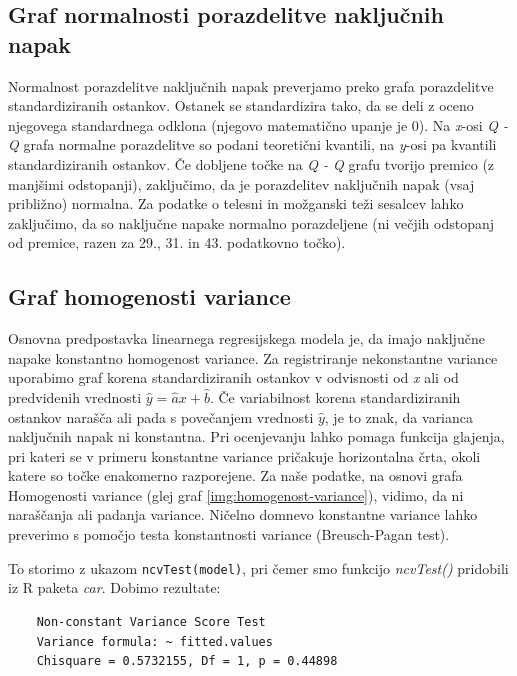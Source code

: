 \subsection{Graf normalnosti porazdelitve naključnih napak}

Normalnost porazdelitve naključnih napak preverjamo preko grafa porazdelitve standardiziranih
ostankov. Ostanek se standardizira tako, da se deli z oceno njegovega standardnega odklona
(njegovo matematično upanje je 0).
Na \emph{x}-osi \emph{Q - Q} grafa normalne porazdelitve so podani teoretični kvantili, na \emph{y}-osi pa kvantili
standardiziranih ostankov.
Če dobljene točke na \emph{Q - Q} grafu tvorijo premico (z manjšimi odstopanji), zaključimo, da je porazdelitev
naključnih napak (vsaj približno) normalna.
Za podatke o telesni in možganski teži sesalcev lahko zaključimo, da so naključne napake normalno porazdeljene
(ni večjih odstopanj od premice, razen za 29., 31. in 43. podatkovno točko).

\subsection{Graf homogenosti variance}

Osnovna predpostavka linearnega regresijskega modela je, da imajo naključne napake konstantno homogenost variance.
Za registriranje nekonstantne variance uporabimo graf korena standardiziranih ostankov v odvisnosti od \emph{x}
ali od predvidenih vrednosti $\widehat{y} = \widehat{a}x + \widehat{b}$.
Če variabilnost korena standardiziranih ostankov narašča ali pada s povečanjem vrednosti $\widehat{y}$, je to znak,
da varianca naključnih napak ni konstantna.
Pri ocenjevanju lahko pomaga funkcija glajenja, pri kateri se v primeru konstantne variance pričakuje horizontalna
črta, okoli katere so točke enakomerno razporejene.
Za naše podatke, na osnovi grafa Homogenosti variance (glej graf \ref{img:homogenost-variance}), vidimo, da ni
naraščanja ali padanja variance.
Ničelno domnevo konstantne variance lahko preverimo s pomočjo testa konstantnosti variance (Breusch-Pagan test).

To storimo z ukazom \verb|ncvTest(model)|, pri čemer smo funkcijo \emph{ncvTest()} pridobili iz R paketa \emph{car}.
Dobimo rezultate:

\begin{verbatim}
    Non-constant Variance Score Test 
    Variance formula: ~ fitted.values 
    Chisquare = 0.5732155, Df = 1, p = 0.44898
\end{verbatim}

